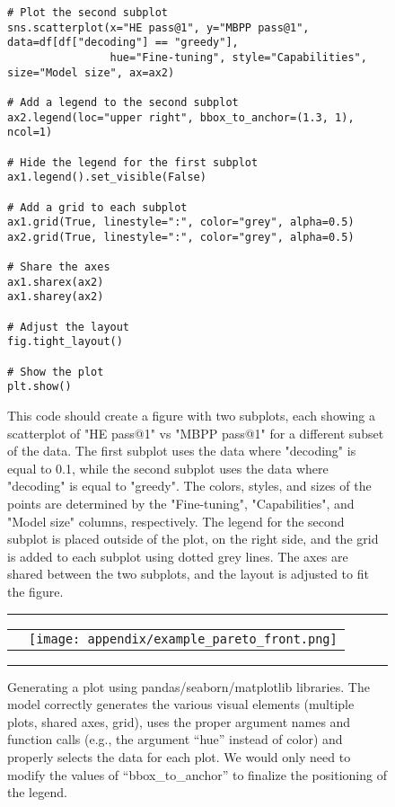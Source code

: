 \documentclass[10pt]{article}
\begin{document}
\begin{figure}
\begin{verbatim}
# Plot the second subplot
sns.scatterplot(x="HE pass@1", y="MBPP pass@1", data=df[df["decoding"] == "greedy"],
                hue="Fine-tuning", style="Capabilities", size="Model size", ax=ax2)

# Add a legend to the second subplot
ax2.legend(loc="upper right", bbox_to_anchor=(1.3, 1), ncol=1)

# Hide the legend for the first subplot
ax1.legend().set_visible(False)

# Add a grid to each subplot
ax1.grid(True, linestyle=":", color="grey", alpha=0.5)
ax2.grid(True, linestyle=":", color="grey", alpha=0.5)

# Share the axes
ax1.sharex(ax2)
ax1.sharey(ax2)

# Adjust the layout
fig.tight_layout()

# Show the plot
plt.show()
\end{verbatim}
This code should create a figure with two subplots, each showing a scatterplot of "HE pass@1" vs "MBPP pass@1" for a different subset of the data. The first subplot uses the data where "decoding" is equal to 0.1, while the second subplot uses the data where "decoding" is equal to "greedy". The colors, styles, and sizes of the points are determined by the "Fine-tuning", "Capabilities", and "Model size" columns, respectively. The legend for the second subplot is placed outside of the plot, on the right side, and the grid is added to each subplot using dotted grey lines. The axes are shared between the two subplots, and the layout is adjusted to fit the figure.\\
\noindent\rule{\textwidth}{1pt}
\begin{tabular}{p{}p{}}
    \raisebox{8em}{\textbf{Generated figure:}} & \texttt{[image: appendix/example\_pareto\_front.png]}
    \\ 
\end{tabular}
\vspace{-0.2cm}
\noindent\rule{\textwidth}{1pt}
\caption{Generating a plot using pandas/seaborn/matplotlib libraries. The model correctly generates the various visual elements (multiple plots, shared axes, grid), uses the proper argument names and function calls (e.g., the argument ``hue'' instead of color) and properly selects the data for each plot. We would only need to modify the values of ``bbox\_to\_anchor'' to finalize the positioning of the legend.\label{fig:generateplot}}
\end{figure}
\end{document}
